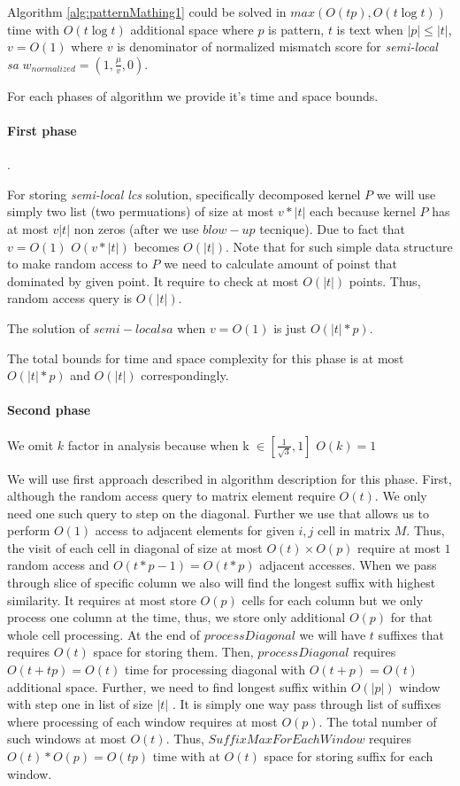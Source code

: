 \begin{theorem}
Algorithm \ref{alg:patternMathing1} could  be solved in
 $max(O(tp),O(t \log t))$  time with $O(t \log t)$ additional space where $p$ is pattern, $t$ is text when $|p| \leq |t|$, $v=O(1)$ where $v$ is denominator of normalized mismatch score for \emph{semi-local sa}
$w_{normalized} = (1,\frac{\mu}{v},0)$.
\end{theorem}

For each phases of algorithm we provide it's time and space bounds.

\paragraph{First phase}.

For storing \emph{semi-local lcs} solution, specifically decomposed kernel $P$ we will use simply two list (two permuations) of size at most $v*|t|$ each because kernel $P$ has at most $v|t|$ non zeros (after we use $blow-up$ tecnique).
Due to fact that $v = O(1)$    $O(v*|t|)$ becomes $O(|t|)$.
Note that for such simple data structure to make random access to $P$ we need to calculate amount of poinst that dominated by given point. It require to check at most   $O(|t|)$ points. 
Thus, random access query is $O(|t|)$.

The solution of $semi-local sa$ when $v=O(1)$ is just $O(|t|*p)$.

The total bounds for time and space complexity for this phase is at most $O(|t|*p)$ and $O(|t|)$ correspondingly.

\paragraph{Second phase}
We omit $k$ factor in analysis because when k $\in [\frac{1}{\sqrt{3}},1]$ $O(k) = 1$

We will use first approach described in algorithm description for this phase.
First, although the random access query to matrix element require $O(t)$.
We only need one such query to step on the diagonal.
Further we use  that allows us to perform $O(1)$ access to adjacent elements for given $i,j$ cell in matrix $M$.
Thus, the visit of each cell in diagonal of size at most $O(t) \times O(p) $ require at most $1$ random access and $O(t*p -1) =O(t*p)$ adjacent accesses.
When we pass through slice of specific column we also will find the longest suffix with highest similarity.
It requires at most store $O(p)$ cells for each column but we only process one column at the time, thus, we store only  additional $O(p)$ for that whole cell processing.
At the end of  $processDiagonal$ we will have $t$ suffixes that requires $O(t)$  space for storing them.
Then, $processDiagonal$ requires $O(t+tp)=O(t)$ time for processing diagonal with $O(t+p)=O(t)$ additional space. 
Further, we need to find longest suffix within $O(|p|)$ window with step one in list of size $|t|$ .
It is simply one way pass through list of suffixes where processing of each window requires at most $O(p)$.
The total number of such windows at most $O(t)$.
Thus, $SuffixMaxForEachWindow$ requires $O(t)*O(p)=O(tp)$ time with at $O(t)$ space for storing suffix for each window. 

